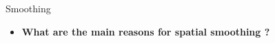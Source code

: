 \documentclass{beamer}
\begin{document}
\begin{frame}{Smoothing}
  \begin{itemize}  
    \item \textbf{What are the main reasons for spatial smoothing ?}

% 
% 
% 
% 
  \end{itemize}
\end{frame}


% 
% 
% 
% 
% 
\end{document}
